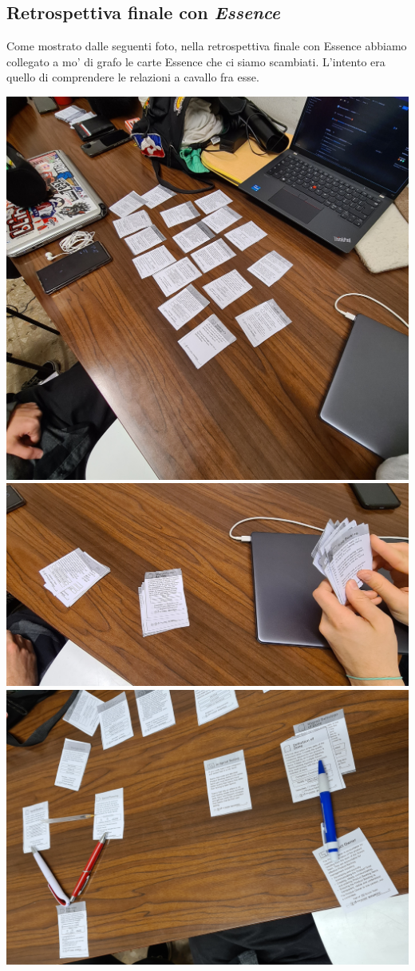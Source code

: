\documentclass{article}
\begin{document}
\subsection{Retrospettiva finale con \emph{Essence}}

Come mostrato dalle seguenti foto, nella retrospettiva finale con Essence
abbiamo collegato a mo' di grafo le carte Essence che ci siamo scambiati.
L'intento era quello di comprendere le relazioni a cavallo fra esse.

\includegraphics[width=\textwidth]{essence-4-1}
\includegraphics[width=\textwidth]{essence-4-2}
\includegraphics[width=\textwidth]{essence-4-3}
\end{document}
